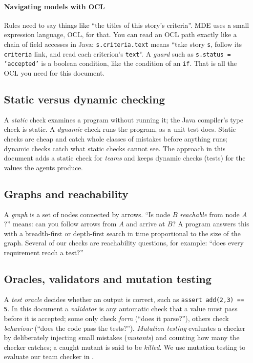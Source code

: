 \documentclass[10pt,a4paper]{article}
\newcommand{\code}[1]{\texttt{#1}}
\begin{document}
\paragraph{Navigating models with OCL} Rules need to say things like
``the titles of this story's criteria''. MDE uses a small expression
language, OCL, for that. You can read an OCL path exactly like a chain of
field accesses in Java: \code{s.criteria.text} means ``take story
\code{s}, follow its \code{criteria} link, and read each criterion's
\code{text}''. A \emph{guard} such as \code{s.status = 'accepted'} is a
boolean condition, like the condition of an \code{if}. That is all the OCL
you need for this document.

\subsection{Static versus dynamic checking}

A \emph{static} check examines a program without running it; the Java
compiler's type check is static. A \emph{dynamic} check runs the program,
as a unit test does. Static checks are cheap and catch whole classes of
mistakes before anything runs; dynamic checks catch what static checks
cannot see. The approach in this document adds a static check for
\emph{teams} and keeps dynamic checks (tests) for the values the agents
produce.

\subsection{Graphs and reachability}

A \emph{graph} is a set of nodes connected by arrows. ``Is node $B$
\emph{reachable} from node $A$?'' means: can you follow arrows from $A$ and
arrive at $B$? A program answers this with a breadth-first or depth-first
search in time proportional to the size of the graph. Several of our checks
are reachability questions, for example: ``does every requirement reach a
test?''

\subsection{Oracles, validators and mutation testing}

A \emph{test oracle} decides whether an output is correct, such as
\code{assert add(2,3) == 5}. In this document a \emph{validator} is any
automatic check that a value must pass before it is accepted; some only
check \emph{form} (``does it parse?''), others check \emph{behaviour} (``does
the code pass the tests?''). \emph{Mutation testing} evaluates a checker by
deliberately injecting small mistakes (\emph{mutants}) and counting how many
the checker catches; a caught mutant is said to be \emph{killed}. We use
mutation testing to evaluate our team checker in .
\end{document}

